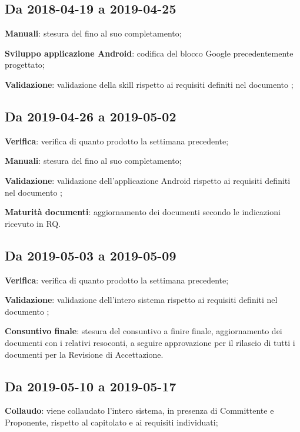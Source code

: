 \begin{flushleft}
\subsection{Da 2018-04-19 a 2019-04-25}
	\item \textbf{Manuali}: stesura del \manualesviluppatore fino al suo completamento;
	\item \textbf{Sviluppo applicazione Android}: codifica del blocco Google precedentemente progettato;
	\item \textbf{Validazione}: validazione della skill rispetto ai requisiti definiti nel documento \analisideirequisiti;
\subsection{Da 2019-04-26 a 2019-05-02}
	\item \textbf{Verifica}: verifica di quanto prodotto la settimana precedente;
	\item \textbf{Manuali}: stesura del \manualeutente fino al suo completamento;
	\item \textbf{Validazione}: validazione dell'applicazione Android rispetto ai requisiti definiti nel documento \analisideirequisiti;
	\item \textbf{Maturità documenti}: aggiornamento dei documenti secondo le indicazioni ricevuto in RQ.
\subsection{Da 2019-05-03 a 2019-05-09}
	\item \textbf{Verifica}: verifica di quanto prodotto la settimana precedente;
	\item \textbf{Validazione}: validazione dell'intero sistema rispetto ai requisiti definiti nel documento \analisideirequisiti;
	\item \textbf{Consuntivo finale}: stesura del consuntivo a finire finale, aggiornamento dei documenti con i relativi resoconti, a seguire approvazione per il rilascio di tutti i documenti per la Revisione di Accettazione.
\subsection{Da 2019-05-10 a 2019-05-17}
	\item \textbf{Collaudo}: viene collaudato l'intero sistema, in presenza di Committente e Proponente, rispetto al capitolato e ai requisiti individuati;
\end{flushleft}

